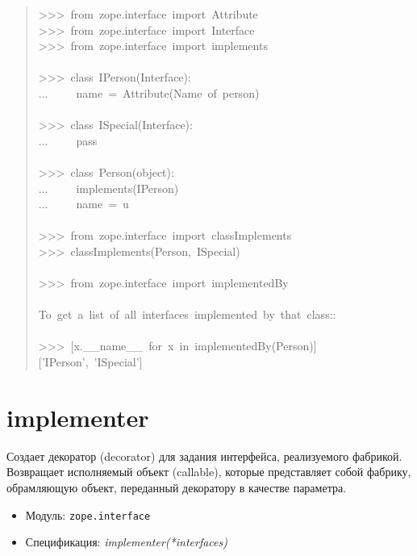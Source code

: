 \documentclass[14pt,a4paper,openany,twoside,final]{extbook}
\providecommand*{\DUroletitlereference}[1]{\textsl{#1}}
\begin{document}
\begin{quote}{\ttfamily \raggedright \noindent
>{}>{}>~from~zope.interface~import~Attribute\\
>{}>{}>~from~zope.interface~import~Interface\\
>{}>{}>~from~zope.interface~import~implements\\
~\\
>{}>{}>~class~IPerson(Interface):\\
...~~~~~name~=~Attribute(\textquotedbl{}Name~of~person\textquotedbl{})\\
~\\
>{}>{}>~class~ISpecial(Interface):\\
...~~~~~pass\\
~\\
>{}>{}>~class~Person(object):\\
...~~~~~implements(IPerson)\\
...~~~~~name~=~u\textquotedbl{}\textquotedbl{}\\
~\\
>{}>{}>~from~zope.interface~import~classImplements\\
>{}>{}>~classImplements(Person,~ISpecial)\\
~\\
>{}>{}>~from~zope.interface~import~implementedBy\\
~\\
To~get~a~list~of~all~interfaces~implemented~by~that~class::\\
~\\
>{}>{}>~{[}x.\_\_name\_\_~for~x~in~implementedBy(Person){]}\\
{[}'IPerson',~'ISpecial'{]}
}
\end{quote}


\section*{implementer%
  \label{implementer}%
}

Создает декоратор (decorator) для задания интерфейса, реализуемого
фабрикой.  Возвращает исполняемый объект (callable), которые
представляет собой фабрику, обрамляющую объект, переданный декоратору
в качестве параметра.

\begin{itemize}

\item Модуль: \texttt{zope.interface}

\item Спецификация: \DUroletitlereference{implementer(*interfaces)}

\end{itemize}
\end{document}
